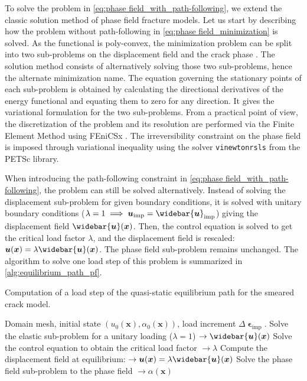 \documentclass[OptSoft]{jtcam_preprint}
\newcommand{\added}[1]{{\color{red} #1}}
\newcommand{\xx}{\bm{x}}
\newcommand{\uu}{\bm{u}}
\newcommand{\uimp}{\uu_{\mathrm{imp}}}
\newcommand{\uimpbar}{\widebar{\uu}_{\mathrm{imp}}}
\newcommand{\eps}{\bm{\upvarepsilon}}
\begin{document}
To solve the problem in \cref{eq:phase field_with_path-following}, we extend the classic solution method of phase field fracture models.
Let us start by describing how the problem without path-following in \cref{eq:phase field_minimization} is solved.
As the functional is poly-convex, the minimization problem can be split into two sub-problems on the displacement field and the crack phase \parencite{bourdin_numerical_2000}.
The solution method consists of alternatively solving those two sub-problems, hence the alternate minimization name.
The equation governing the stationary points of each sub-problem is obtained by calculating the directional derivatives of the energy functional and equating them to zero for any direction.
It gives the variational formulation for the two sub-problems.
From a practical point of view, the discretization of the problem and its resolution are performed via the Finite Element Method using FEniCSx \parencite{alnaes_unified_2014,baratta_dolfinx_2023}.
The irreversibility constraint on the phase field is imposed through variational inequality using the solver \texttt{vinewtonrsls} from the PETSc library.

When introducing the path-following constraint in \cref{eq:phase field_with_path-following}, the problem can still be solved alternatively.
Instead of solving the displacement sub-problem for given boundary conditions, it is solved with unitary boundary conditions ($\lambda = 1 \implies \uimp = \uimpbar$) giving the displacement field $\widebar{\uu}(\xx)$.
Then, the control equation is solved to get the critical load factor $\lambda$, and the displacement field is rescaled: $\uu(\xx) = \lambda \widebar{\uu}(\xx)$.
The phase field sub-problem remains unchanged.
The algorithm to solve one load step of this problem is summarized in \cref{alg:equilibrium_path_pf}.

\begin{Algorithm}
\caption{Computation of a load step of the quasi-static equilibrium path for the smeared crack model.}
\label{alg:equilibrium_path_pf}
\begin{algorithmic}[1]
  \Require Domain mesh, initial state $(u_0(\xx), \alpha_0(\xx))$, load increment $\Delta \eps_{\mathrm{imp}}$.
    \State Solve the elastic sub-problem for a unitary loading ($\lambda = 1$) $\to \widebar{\uu}(\xx)$
    \State Solve the control equation to obtain the critical load factor $\to \lambda$
    \State Compute the displacement field at equilibrium: $\to \uu(\xx) = \lambda \widebar{\uu}(\xx)$
    \State Solve the phase field sub-problem to the phase field $\to \alpha(\xx)$ \label{lst:phase_field_subproblem}
  \EndWhile
\end{algorithmic}
\end{Algorithm}
\end{document}
